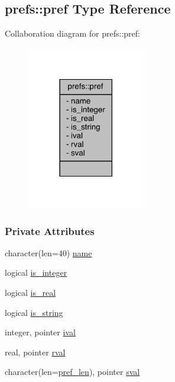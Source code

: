\hypertarget{structprefs_1_1pref}{\subsection{prefs\-:\-:pref Type Reference}
\label{structprefs_1_1pref}
}


Collaboration diagram for prefs\-:\-:pref\-:
\nopagebreak
\begin{figure}[H]
\begin{center}
\leavevmode
\includegraphics[width=146pt]{structprefs_1_1pref__coll__graph}
\end{center}
\end{figure}
\subsubsection*{Private Attributes}
\begin{DoxyCompactItemize}
\item 
character(len=40) \hyperlink{structprefs_1_1pref_ac61a79b96d08a6af61563f2304ad2bd0}{name}
\item 
logical \hyperlink{structprefs_1_1pref_aca5cafe098d6ef63a8970ac172f5d521}{is\-\_\-integer}
\item 
logical \hyperlink{structprefs_1_1pref_afc74b0ae1b6b7e4a79d6397deb2e1fc8}{is\-\_\-real}
\item 
logical \hyperlink{structprefs_1_1pref_acd8b6d8855bde737428b9134e5c89ad4}{is\-\_\-string}
\item 
integer, pointer \hyperlink{structprefs_1_1pref_a2d1743633856795fc8eef1b5587c73e9}{ival}
\item 
real, pointer \hyperlink{structprefs_1_1pref_a58e211e8c4ae44b8827aa94a1756f83a}{rval}
\item 
character(len=\hyperlink{classprefs_a7290161561ea5360d0049f36d9d3a31a}{pref\-\_\-len}), pointer \hyperlink{structprefs_1_1pref_a50fa4941c43361d7953f99ae166954ee}{sval}
\end{DoxyCompactItemize}


